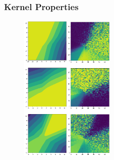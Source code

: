 \begin{frame}
\frametitle{Kernel Properties}

    \begin{figure}[h]
        \centering
\includegraphics[width=0.20\textwidth]{c4_figures/kers_square.png}\includegraphics[width=0.20\textwidth]{c4_figures/vars_square.png}
      \end{figure}
      \end{frame}

